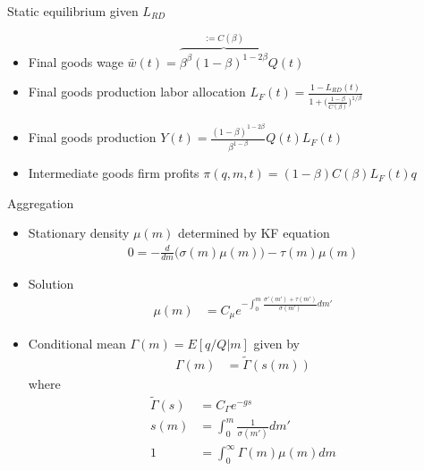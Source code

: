 \documentclass[english,usenames,dvipsnames]{beamer}
\begin{document}
\begin{frame}{Static equilibrium given $L_{RD}$}\label{static_eq_conditions}
\hyperlink{closing_the_model}{}
\begin{itemize}
\item Final goods wage $\bar{w}(t) = \overbrace{\beta^{\beta} (1-\beta)^{1-2\beta}}^{:= C(\beta)} Q(t)$
\item Final goods production labor allocation $L_F(t) = \frac{1 - L_{RD}(t)}{1 + \big(\frac{1-\beta}{C(\beta)}\big)^{1/\beta}}$
\item Final goods production $Y(t) = \frac{(1-\beta)^{1-2\beta}}{\beta^{1-\beta}} Q(t) L_F(t)$
\item Intermediate goods firm profits $\pi(q,m,t) = (1-\beta) C(\beta) L_F(t) q $ 
\end{itemize}
\end{frame}

\begin{frame}{Aggregation}\label{aggregation}
\hyperlink{closing_the_model}{}
\small
\begin{itemize}
\item Stationary density $\mu(m)$ determined by KF equation
\begin{align*}
0 = - \frac{d}{dm} \Big( \sigma(m) \mu(m) \Big) - \tau(m) \mu(m)
\end{align*}
\item Solution
\begin{align*}
\mu(m) &= C_\mu e^{-\int_0^m \frac{\sigma'(m') + \tau(m')}{\sigma(m')}dm'} 
\end{align*}
\item Conditional mean $\Gamma(m) = E[q/Q | m]$ given by 
\begin{align*}
\Gamma(m) &= \tilde{\Gamma}(s(m))
\end{align*}
where
\begin{align*}
\tilde{\Gamma}(s) &= C_{\Gamma} e^{-gs} \\
s(m) &= \int_0^m \frac{1}{\sigma(m')} dm' \\
1 &= \int_0^{\infty} \Gamma(m) \mu(m) dm
\end{align*}
\end{itemize}
\end{frame}
\end{document}
